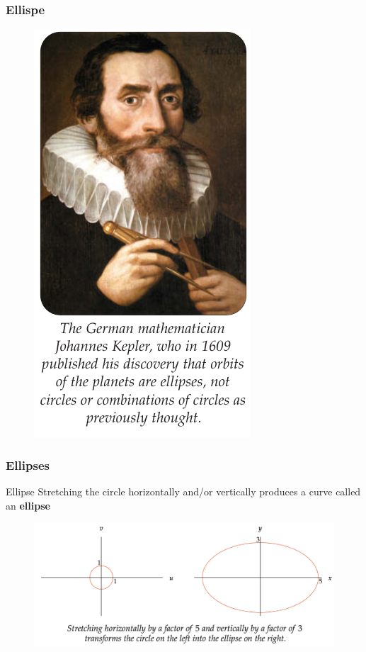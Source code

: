 \documentclass{beamer}
\begin{document}
 \begin{frame}
  \frametitle{Ellispe}
  \begin{figure}
    \centering
    \includegraphics[scale=0.38]{ellipse0.png}
  \end{figure}
 \end{frame}


 \begin{frame}
  \frametitle{Ellipses}
  \begin{block}{Ellipse}
    Stretching the circle horizontally and/or vertically produces a curve called an \textbf{ellipse}
  \end{block}
  \begin{figure}
    \centering 
    \includegraphics[scale=0.4]{ellipse.png}
  \end{figure}
 \end{frame}
 
\end{document}

